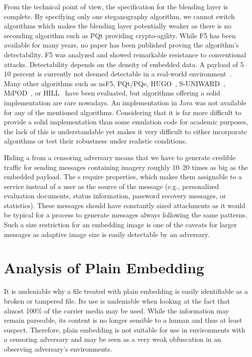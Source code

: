 From the technical point of view, the specification for the blending layer is complete. By specifying only one steganography algorithm, we cannot switch algorithms which makes the blending layer potentially weaker as there is no seconding algorithm such as PQt providing crypto-agility. While F5 has been available for many years, no paper has been published proving the algorithm's detectability. F5 was analyzed and showed remarkable resistance to conventional attacks. Detectability depends on the density of embedded data. A payload of 5--10 percent is currently not deemed detectable in a real-world environment~\cite{fridrich2007statistically}. Many other algorithms such as nsF5, PQt/PQe, HUGO~\cite{pevny2010using}, S-UNIWARD~\cite{holub2014universal}, MiPOD~\cite{sedighi2015content}, or HILL~\cite{li2014new} have been evaluated, but algorithms offering a solid implementation are rare nowadays. An implementation in Java was not available for any of the mentioned algorithms. Considering that it is far more difficult to provide a solid implementation than some emulation code for academic purposes, the lack of this is understandable yet makes it very difficult to either incorporate algorithms or test their robustness under realistic conditions.

Hiding a \VortexNode{} from a censoring adversary means that we have to generate credible traffic for sending messages containing imagery roughly 10--20 times as big as the embedded payload. The s require properties, which makes them assignable to a service instead of a user as the source of the message (e.g., personalized evaluation documents, status information, password recovery messages, or statistics). These messages should have constantly sized attachments as it would be typical for a process to generate messages always following the same patterns. Such a size restriction for an embedding image is one of the caveats for larger messages as adaptive image size is easily detectable by an adversary. 

\section{Analysis of Plain Embedding}
It is undeniable why a file treated with plain embedding is easily identifiable as a broken or tampered file. Its use is undeniable when looking at the fact that almost 100\% of the carrier media may be used. While the information may remain parseable, its content is no longer sensible to a human and thus at least suspect. Therefore, plain embedding is not suitable for use in environments with a censoring adversary and may be seen as a very weak obfuscation in an observing adversary's environments.

